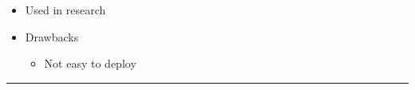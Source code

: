 \documentclass[12pt,preprintnumbers,amsmath,amssymb,nofootinbib,superscriptaddress]{revtex4-1}
\begin{document}
\begin{minipage}{0.6\textwidth}

\begin{itemize}
  \item Used in research
  \item Drawbacks 
  \begin{itemize}
    \item Not easy to deploy 
  \end{itemize}
\end{itemize}

\end{minipage}

\begin{minipage}{0.39\textwidth}



\end{minipage}

\vspace{\fill}
\centering


\newpage 
{}
\vspace{-0.2cm}\hrule



\vspace{\fill}
\centering
\end{document}

